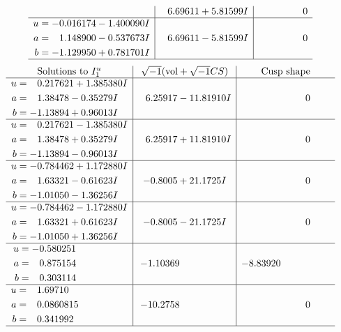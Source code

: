 \documentclass[1p]{elsarticle_modified}
\theoremstyle{definition}
\newcommand{\I}{\sqrt{-1}}
\begin{document}
$$\begin{array}{c|c|c}
 & \phantom{-}6.69611 + 5.81599 I & \phantom{-0.000000 } 0 \\ \hline\begin{aligned}
u &= -0.016174 - 1.400090 I \\
a &= \phantom{-}1.148900 - 0.537673 I \\
b &= -1.129950 + 0.781701 I\end{aligned}
 & \phantom{-}6.69611 - 5.81599 I & \phantom{-0.000000 } 0\\
 \hline 
 \end{array}$$\newpage$$\begin{array}{c|c|c}  
\text{Solutions to }I^u_{1}& \I (\text{vol} + \sqrt{-1}CS) & \text{Cusp shape}\\
 \hline 
\begin{aligned}
u &= \phantom{-}0.217621 + 1.385380 I \\
a &= \phantom{-}1.38478 - 0.35279 I \\
b &= -1.13894 + 0.96013 I\end{aligned}
 & \phantom{-}6.25917 - 11.81910 I & \phantom{-0.000000 } 0 \\ \hline\begin{aligned}
u &= \phantom{-}0.217621 - 1.385380 I \\
a &= \phantom{-}1.38478 + 0.35279 I \\
b &= -1.13894 - 0.96013 I\end{aligned}
 & \phantom{-}6.25917 + 11.81910 I & \phantom{-0.000000 } 0 \\ \hline\begin{aligned}
u &= -0.784462 + 1.172880 I \\
a &= \phantom{-}1.63321 - 0.61623 I \\
b &= -1.01050 - 1.36256 I\end{aligned}
 & -0.8005 + 21.1725 I & \phantom{-0.000000 } 0 \\ \hline\begin{aligned}
u &= -0.784462 - 1.172880 I \\
a &= \phantom{-}1.63321 + 0.61623 I \\
b &= -1.01050 + 1.36256 I\end{aligned}
 & -0.8005 - 21.1725 I & \phantom{-0.000000 } 0 \\ \hline\begin{aligned}
u &= -0.580251\phantom{ +0.000000I} \\
a &= \phantom{-}0.875154\phantom{ +0.000000I} \\
b &= \phantom{-}0.303114\phantom{ +0.000000I}\end{aligned}
 & -1.10369\phantom{ +0.000000I} & -8.83920\phantom{ +0.000000I} \\ \hline\begin{aligned}
u &= \phantom{-}1.69710\phantom{ +0.000000I} \\
a &= \phantom{-}0.0860815\phantom{ +0.000000I} \\
b &= \phantom{-}0.341992\phantom{ +0.000000I}\end{aligned}
 & -10.2758\phantom{ +0.000000I} & \phantom{-0.000000 } 0\\
 \hline 
 \end{array}$$\newpage\newpage\renewcommand{\arraystretch}{1}
\end{document}
